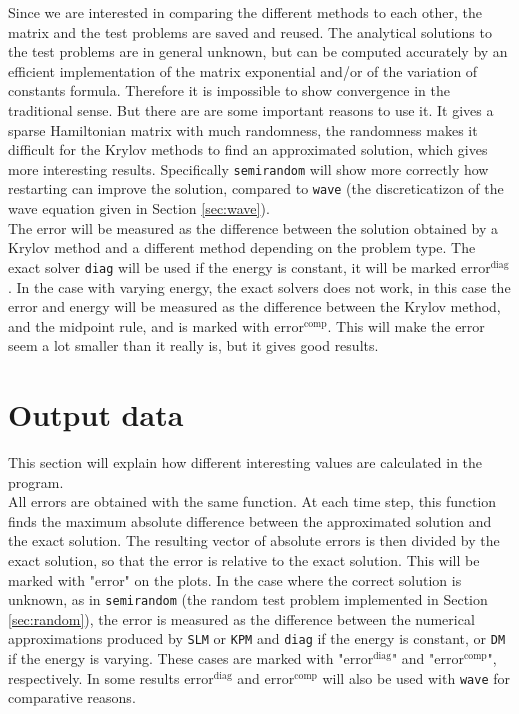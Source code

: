 \noindent Since we are interested in comparing the different methods to each other, the matrix and the test problems are saved and reused. 
The analytical solutions to the test problems are in general unknown, but can be computed accurately by an efficient implementation of the matrix exponential and/or of the variation of constants formula. Therefore it is impossible to show convergence in the traditional sense. But there are are some important reasons to use it. It gives a sparse Hamiltonian matrix with much randomness, the randomness makes it difficult for the Krylov methods to find an approximated solution, which gives more interesting results. Specifically \texttt{semirandom} will show more correctly how restarting can improve the solution, compared to \texttt{wave} (the discreticatizon of the wave equation given in Section \ref{sec:wave}).  \\

\noindent The error will be measured as the difference between the solution obtained by a Krylov method and a different method depending on the problem type. The exact solver \texttt{diag} will be used if the energy is constant, it will be marked $\text{error}^{\text{diag}}$. In the case with varying energy, the exact solvers does not work, in this case the error and energy will be measured as the difference between the Krylov method, and the midpoint rule, and is marked with $\text{error}^{\text{comp}}$. This will make the error seem a lot smaller than it really is, but it gives good results.

\section{Output data} %
\label{sec:outdata}
This section will explain how different interesting values are calculated in the program. \\

\noindent All errors are obtained with the same function. At each time step, this function finds the maximum absolute difference between the approximated solution and the exact solution. The resulting vector of absolute errors is then divided by the exact solution, so that the error is relative to the exact solution. This will be marked with "error" on the plots. In the case where the correct solution is unknown, as in \texttt{semirandom} (the random test problem implemented in Section \ref{sec:random}), the error is measured as the difference between the numerical approximations produced by \texttt{SLM} or \texttt{KPM} and \texttt{diag} if the energy is constant, or \texttt{DM} if the energy is varying. These cases are marked with "$\text{error}^{\text{diag}}$" and "$\text{error}^{\text{comp}}$", respectively. In some results $\text{error}^{\text{diag}}$ and $\text{error}^{\text{comp}}$ will also be used with \texttt{wave} for comparative reasons.  \\

